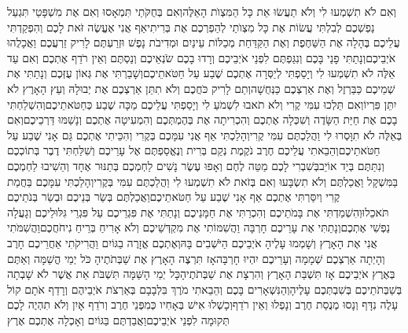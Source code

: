 \documentclass[../main/main.tex]{subfiles}
\begin{document}
\begin{multicols*}{\ncols}
וְאִם לֹא תִשְׁמְעוּ לִי וְלֹא תַעֲשׂוּ אֵת כָּל הַמִּצְוֺת הָאֵלֶּה\PreVerseSpace{}וְאִם בְּחֻקֹּתַי תִּמְאָסוּ וְאִם אֶת מִשְׁפָּטַי תִּגְעַל נַפְשְׁכֶם לְבִלְתִּי עֲשׂוֹת אֶת כָּל מִצְוֺתַי לְהַפְרְכֶם אֶת בְּרִיתִי\PreVerseSpace{}אַף אֲנִי אֶעֱשֶׂה זֹּאת לָכֶם וְהִפְקַדְתִּי עֲלֵיכֶם בֶּהָלָה אֶת הַשַּׁחֶפֶת וְאֶת הַקַּדַּחַת מְכַלּוֹת עֵינַיִם וּמְדִיבֹת נָפֶשׁ וּזְרַעְתֶּם לָרִיק זַרְעֲכֶם וַאֲכָלֻהוּ אֹיְבֵיכֶם\PreVerseSpace{}וְנָתַתִּי פָנַי בָּכֶם וְנִגַּפְתֶּם לִפְנֵי אֹיְבֵיכֶם וְרָדוּ בָכֶם שֹׂנְאֵיכֶם וְנַסְתֶּם וְאֵין רֹדֵף אֶתְכֶם \ClosedSection{}וְאִם עַד אֵלֶּה לֹא תִשְׁמְעוּ לִי וְיָסַפְתִּי לְיַסְּרָה אֶתְכֶם שֶׁבַע עַל חַטֹּאתֵיכֶם\PreVerseSpace{}וְשָׁבַרְתִּי אֶת גְּאוֹן עֻזְּכֶם וְנָתַתִּי אֶת שְׁמֵיכֶם כַּבַּרְזֶל וְאֶת אַרְצְכֶם כַּנְּחֻשָׁה\PreVerseSpace{}וְתַם לָרִיק כֹּחֲכֶם וְלֹא תִתֵּן אַרְצְכֶם אֶת יְבוּלָהּ וְעֵץ הָאָרֶץ לֹא יִתֵּן פִּרְיוֹ\PreVerseSpace{}וְאִם תֵּלְכוּ עִמִּי קֶרִי וְלֹא תֹאבוּ לִשְׁמֹעַ לִי וְיָסַפְתִּי עֲלֵיכֶם מַכָּה שֶׁבַע כְּחַטֹּאתֵיכֶם\PreVerseSpace{}וְהִשְׁלַחְתִּי בָכֶם אֶת חַיַּת הַשָּׂדֶה וְשִׁכְּלָה אֶתְכֶם וְהִכְרִיתָה אֶת בְּהֶמְתְּכֶם וְהִמְעִיטָה אֶתְכֶם וְנָשַׁמּוּ דַּרְכֵיכֶם\PreVerseSpace{}וְאִם בְּאֵלֶּה לֹא תִוָּסְרוּ לִי וַהֲלַכְתֶּם עִמִּי קֶרִי\PreVerseSpace{}וְהָלַכְתִּי אַף אֲנִי עִמָּכֶם בְּקֶרִי וְהִכֵּיתִי אֶתְכֶם גַּם אָנִי שֶׁבַע עַל חַטֹּאתֵיכֶם\PreVerseSpace{}וְהֵבֵאתִי עֲלֵיכֶם חֶרֶב נֹקֶמֶת נְקַם בְּרִית וְנֶאֱסַפְתֶּם אֶל עָרֵיכֶם וְשִׁלַּחְתִּי דֶבֶר בְּתוֹכְכֶם וְנִתַּתֶּם בְּיַד אוֹיֵב\PreVerseSpace{}בְּשִׁבְרִי לָכֶם מַטֵּה לֶחֶם וְאָפוּ עֶשֶׂר נָשִׁים לַחְמְכֶם בְּתַנּוּר אֶחָד וְהֵשִׁיבוּ לַחְמְכֶם בַּמִּשְׁקָל וַאֲכַלְתֶּם וְלֹא תִשְׂבָּעוּ \ClosedSection{}וְאִם בְּזֹאת לֹא תִשְׁמְעוּ לִי וַהֲלַכְתֶּם עִמִּי בְּקֶרִי\PreVerseSpace{}וְהָלַכְתִּי עִמָּכֶם בַּחֲמַת קֶרִי וְיִסַּרְתִּי אֶתְכֶם אַף אָנִי שֶׁבַע עַל חַטֹּאתֵיכֶם\PreVerseSpace{}וַאֲכַלְתֶּם בְּשַׂר בְּנֵיכֶם וּבְשַׂר בְּנֹתֵיכֶם תֹּאכֵלוּ\PreVerseSpace{}וְהִשְׁמַדְתִּי אֶת בָּמֹתֵיכֶם וְהִכְרַתִּי אֶת חַמָּנֵיכֶם וְנָתַתִּי אֶת פִּגְרֵיכֶם עַל פִּגְרֵי גִּלּוּלֵיכֶם וְגָעֲלָה נַפְשִׁי אֶתְכֶם\PreVerseSpace{}וְנָתַתִּי אֶת עָרֵיכֶם חָרְבָּה וַהֲשִׁמּוֹתִי אֶת מִקְדְּשֵׁיכֶם וְלֹא אָרִיחַ בְּרֵיחַ נִיחֹחֲכֶם\PreVerseSpace{}וַהֲשִׁמֹּתִי אֲנִי אֶת הָאָרֶץ וְשָׁמְמוּ עָלֶיהָ אֹיְבֵיכֶם הַיֹּשְׁבִים בָּהּ\PreVerseSpace{}וְאֶתְכֶם אֱזָרֶה בַגּוֹיִם וַהֲרִיקֹתִי אַחֲרֵיכֶם חָרֶב וְהָיְתָה אַרְצְכֶם שְׁמָמָה וְעָרֵיכֶם יִהְיוּ חָרְבָּה\PreVerseSpace{}אָז תִּרְצֶה הָאָרֶץ אֶת שַׁבְּתֹתֶיהָ כֹּל יְמֵי הֳשַׁמָּה וְאַתֶּם בְּאֶרֶץ אֹיְבֵיכֶם אָז תִּשְׁבַּת הָאָרֶץ וְהִרְצָת אֶת שַׁבְּתֹתֶיהָ\PreVerseSpace{}כָּל יְמֵי הָשַּׁמָּה תִּשְׁבֹּת אֵת אֲשֶׁר לֹא שָׁבְתָה בְּשַׁבְּתֹתֵיכֶם בְּשִׁבְתְּכֶם עָלֶיהָ\PreVerseSpace{}וְהַנִּשְׁאָרִים בָּכֶם וְהֵבֵאתִי מֹרֶךְ בִּלְבָבָם בְּאַרְצֹת אֹיְבֵיהֶם וְרָדַף אֹתָם קוֹל עָלֶה נִדָּף וְנָסוּ מְנֻסַת חֶרֶב וְנָפְלוּ וְאֵין רֹדֵף\PreVerseSpace{}וְכָשְׁלוּ אִישׁ בְּאָחִיו כְּמִפְּנֵי חֶרֶב וְרֹדֵף אָיִן וְלֹא תִהְיֶה לָכֶם תְּקוּמָה לִפְנֵי אֹיְבֵיכֶם\PreVerseSpace{}וַאֲבַדְתֶּם בַּגּוֹיִם וְאָכְלָה אֶתְכֶם אֶרֶץ 
\end{multicols*}
\end{document}
